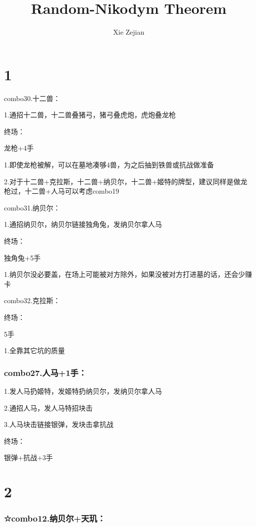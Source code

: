 \documentclass[
]{article}
\title{Random-Nikodym Theorem}
\author{Xie Zejian}
\date{}
\begin{document}
\maketitle

{
\setcounter{tocdepth}{2}
\tableofcontents
}
\hypertarget{section}{%
\section{1}\label{section}}

combo30.十二兽：

1.通招十二兽，十二兽叠猪弓，猪弓叠虎炮，虎炮叠龙枪

终场：

龙枪+4手

1.即使龙枪被解，可以在墓地凑够4兽，为之后抽到铁兽或抗战做准备

2.对于十二兽+克拉斯，十二兽+纳贝尔，十二兽+姬特的牌型，建议同样是做龙枪过，十二兽+人马可以考虑combo19

combo31.纳贝尔：

1.通招纳贝尔，纳贝尔链接独角兔，发纳贝尔拿人马

终场：

独角兔+5手

1.纳贝尔没必要盖，在场上可能被对方除外，如果没被对方打进墓的话，还会少赚卡

combo32.克拉斯：

终场：

5手

1.全靠其它坑的质量

\hypertarget{combo27.ux4ebaux9a6c1ux624b}{%
\subsubsection{combo27.人马+1手：}\label{combo27.ux4ebaux9a6c1ux624b}}

1.发人马扔姬特，发姬特扔纳贝尔，发纳贝尔拿人马

2.通招人马，发人马特招块击

3.人马块击链接银弹，发块击拿抗战

终场：

银弹+抗战+3手

\hypertarget{section-1}{%
\section{2}\label{section-1}}

\hypertarget{combo12.ux7eb3ux8d1dux5c14ux5929ux7391}{%
\subsubsection{☆combo12.纳贝尔+天玑：}\label{combo12.ux7eb3ux8d1dux5c14ux5929ux7391}}
\end{document}
